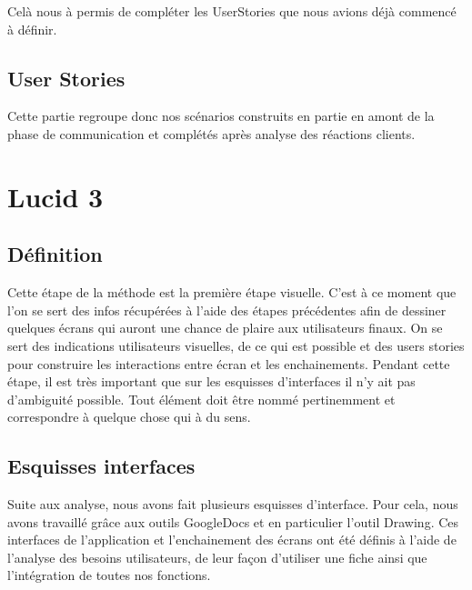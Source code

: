 \documentclass[11pt,a4paper]{article}
\begin{document}
Celà nous à permis de compléter les UserStories que nous avions déjà commencé à
définir.\\

\subsection{User Stories}

Cette partie regroupe donc nos scénarios construits en partie en amont de la
phase de communication et complétés après analyse des réactions clients.










\section{Lucid 3}

\subsection{Définition}

Cette étape de la méthode est la première étape visuelle. C'est à ce moment que
l'on se sert des infos récupérées à l'aide des étapes précédentes afin de
dessiner quelques écrans qui auront une chance de plaire aux utilisateurs
finaux. On se sert des indications utilisateurs visuelles, de ce qui est
possible et des users stories pour construire les interactions entre écran et
les enchainements. Pendant cette étape, il est très important que sur les
esquisses d'interfaces il n'y ait pas d'ambiguité possible. Tout élément doit
être nommé pertinemment et correspondre à quelque chose qui à du sens.


\subsection{Esquisses interfaces}

Suite aux analyse, nous avons fait plusieurs esquisses d'interface. Pour
cela, nous avons travaillé grâce aux outils GoogleDocs et en particulier l'outil
Drawing. Ces interfaces de l'application et l'enchainement des écrans ont été
définis à l'aide de l'analyse des besoins utilisateurs, de leur façon
d'utiliser une fiche ainsi que l'intégration de toutes nos fonctions.\\
\end{document}
